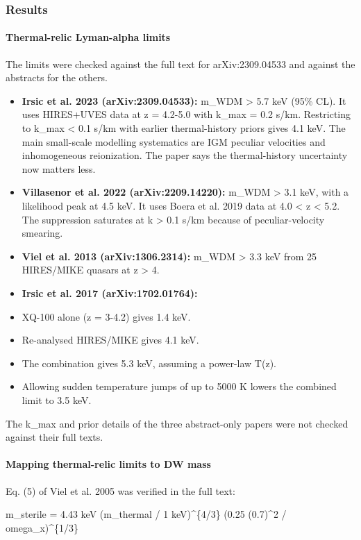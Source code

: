 \documentclass[11pt,a4paper]{article}
\begin{document}
\subsubsection*{Results}
\paragraph{Thermal-relic Lyman-alpha limits}
The limits were checked against the full text for arXiv:2309.04533 and against the abstracts for the others.

\begin{itemize}
  \item \textbf{Irsic et al. 2023 (arXiv:2309.04533):} m\_WDM \textgreater{} 5.7 keV (95\% CL). It uses HIRES+UVES data at z = 4.2-5.0 with k\_max = 0.2 s/km. Restricting to k\_max \textless{} 0.1 s/km with earlier thermal-history priors gives 4.1 keV. The main small-scale modelling systematics are IGM peculiar velocities and inhomogeneous reionization. The paper says the thermal-history uncertainty now matters less.
  \item \textbf{Villasenor et al. 2022 (arXiv:2209.14220):} m\_WDM \textgreater{} 3.1 keV, with a likelihood peak at 4.5 keV. It uses Boera et al. 2019 data at 4.0 \textless{} z \textless{} 5.2. The suppression saturates at k \textgreater{} 0.1 s/km because of peculiar-velocity smearing.
  \item \textbf{Viel et al. 2013 (arXiv:1306.2314):} m\_WDM \textgreater{} 3.3 keV from 25 HIRES/MIKE quasars at z \textgreater{} 4.
  \item \textbf{Irsic et al. 2017 (arXiv:1702.01764):}
  \item XQ-100 alone (z = 3-4.2) gives 1.4 keV.
  \item Re-analysed HIRES/MIKE gives 4.1 keV.
  \item The combination gives 5.3 keV, assuming a power-law T(z).
  \item Allowing sudden temperature jumps of up to 5000 K lowers the combined limit to 3.5 keV.
\end{itemize}
The k\_max and prior details of the three abstract-only papers were not checked against their full texts.

\paragraph{Mapping thermal-relic limits to DW mass}
Eq. (5) of Viel et al. 2005 was verified in the full text:

m\_sterile = 4.43 keV (m\_thermal / 1 keV)\textasciicircum{}\{4/3\} (0.25 (0.7)\textasciicircum{}2 / omega\_x)\textasciicircum{}\{1/3\}
\end{document}

